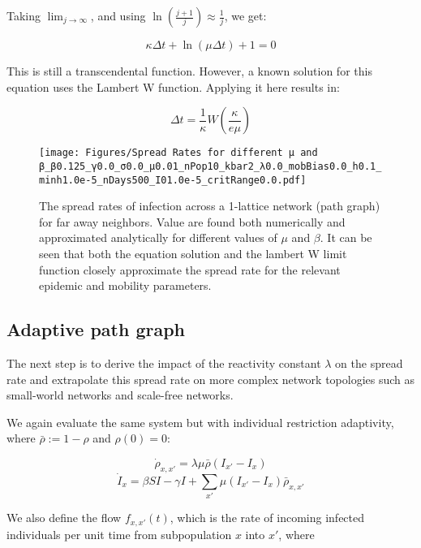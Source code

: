 Taking $\lim_{j \to \infty}$, and using $\ln\left( \frac{{j+1}}{j} \right) \approx \frac{1}{j}$, we get:

\begin{equation}
\kappa \Delta t + \ln( \mu \Delta t ) + 1 = 0
\end{equation}

This is still a transcendental function. However, a known solution for this equation uses the Lambert W function. Applying it here results in:

\begin{equation}
\Delta t = \frac{1}{\kappa} W\left(\frac{\kappa}{e \mu}\right)
\end{equation}

\begin{figure}[!ht]
    \centering
    \texttt{[image: Figures/Spread Rates for different μ and β\_β0.125\_γ0.0\_σ0.0\_μ0.01\_nPop10\_kbar2\_λ0.0\_mobBias0.0\_h0.1\_minh1.0e-5\_nDays500\_I01.0e-5\_critRange0.0.pdf]}
    \caption{\small The spread rates of infection across a 1-lattice network (path graph) for far away neighbors. Value are found both numerically and approximated analytically for different values of $\mu$ and $\beta$. It can be seen that both the equation solution and the lambert W limit function closely approximate the spread rate for the relevant epidemic and mobility parameters.}
    \label{Spread Rates mu beta}
\end{figure}

\subsection{Adaptive path graph}
The next step is to derive the impact of the reactivity constant $\lambda$ on the spread rate and extrapolate this spread rate on more complex network topologies such as small-world networks and scale-free networks.

We again evaluate the same system but with individual restriction adaptivity, where $\bar \rho := 1 - \rho$ and $\rho(0) = 0$:

\begin{equation}
\dot \rho_{x,x'} = \lambda \mu \bar \rho (I_{x'} - I_x)
\end{equation}
\begin{equation}
\dot I_x = \beta S I - \gamma I +  \sum_{x'} \mu (I_{x'} - I_x) \bar \rho_{x,x'}
\end{equation}

We also define the flow $f_{x,x'}(t)$, which is the rate of incoming infected individuals per unit time from subpopulation $x$ into $x'$, where 

